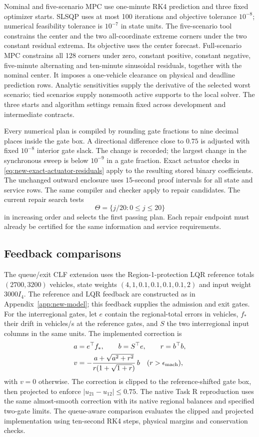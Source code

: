 \documentclass[journal,10pt]{IEEEtran}
\newcommand{\appref}[1]{Appendix~\ref{#1}}
\begin{document}
Nominal and five-scenario MPC use one-minute RK4 prediction and three
fixed optimizer starts. SLSQP uses at most 100 iterations and objective
tolerance $10^{-8}$; numerical feasibility tolerance is $10^{-7}$ in state
units. The five-scenario tool constrains the center and the two
all-coordinate extreme corners under the two constant residual extrema.
Its objective uses the center forecast. Full-scenario MPC constrains all
128 corners under zero, constant positive, constant negative, five-minute
alternating and ten-minute sinusoidal residuals, together with the nominal
center. It imposes a one-vehicle clearance on physical and deadline
prediction rows. Analytic sensitivities supply the derivative of the
selected worst scenario; tied scenarios supply nonsmooth active supports
to the local solver. The three starts and algorithm settings remain fixed
across development and intermediate contracts.

Every numerical plan is compiled by rounding gate fractions to nine
decimal places inside the gate box. A directional difference close to
$0.75$ is adjusted with fixed $10^{-8}$ interior gate slack. The change is
recorded; the largest change in the synchronous sweep is below $10^{-9}$
in a gate fraction. Exact actuator checks in
\eqref{eq:new-exact-actuator-residuals} apply to the resulting stored
binary coefficients. The unchanged outward enclosure uses 15-second proof
intervals for all state and service rows. The same compiler and checker
apply to repair candidates. The current repair search tests
\[
\Theta=\{j/20:0\le j\le20\}
\]
in increasing order and selects the first passing plan. Each repair
endpoint must already be certified for the same information and service
requirements.

\subsection{Feedback comparisons}
\label{app:benchmark-details}
The queue/exit CLF extension uses the Region-1-protection LQR reference
totals $(2700,3200)$ vehicles, state weights
$(4,1,0.1,0.1,0.1,0.1,2)$ and input weight $3000I_4$. The reference and LQR
feedback are constructed as in \appref{app:new-model}; this feedback
supplies the admission and exit gates. For the interregional gates, let
$e$ contain the regional-total errors in vehicles, $f_*$ their drift in
vehicles/s at the reference gates, and $S$ the two interregional input
columns in the same units. The implemented correction is
\[
\begin{aligned}
a&=e^\top f_*,\qquad b=S^\top e,\qquad r=b^\top b,\\
v&=-\frac{a+\sqrt{a^2+r^2}}{r(1+\sqrt{1+r})}\,b
\quad(r>\epsilon_{\rm mach}),
\end{aligned}
\]
with $v=0$ otherwise. The correction is clipped to the reference-shifted
gate box, then projected to enforce $|u_{21}-u_{12}|\le0.75$. The native
Task R reproduction uses the same almost-smooth correction with its native
regional balances and specified two-gate limits. The queue-aware
comparison evaluates the clipped and projected implementation using
ten-second RK4 steps, physical margins and conservation checks.
\end{document}
